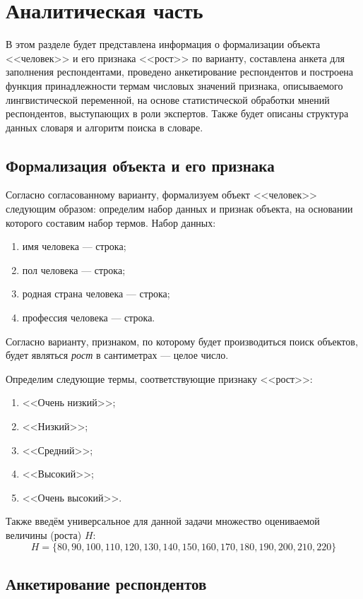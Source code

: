 \chapter{Аналитическая часть}
В этом разделе будет представлена информация о формализации объекта <<человек>> и его признака <<рост>> по варианту, составлена анкета для заполнения респондентами, проведено анкетирование респондентов и построена функция принадлежности термам числовых значений признака, описываемого лингвистической переменной, на основе статистической обработки мнений респондентов, выступающих в роли экспертов.
Также будет описаны структура данных словаря и алгоритм поиска в словаре. 

\section{Формализация объекта и его признака}
Согласно согласованному варианту, формализуем объект <<человек>> следующим образом: определим набор данных и признак объекта, на основании которого составим набор термов.
Набор данных:
\begin{enumerate}[label=\arabic*)]
	\item имя человека --- строка;
	\item пол человека --- строка;
	\item родная страна человека --- строка;
	\item профессия человека --- строка.
\end{enumerate}
Согласно варианту, признаком, по которому будет производиться поиск объектов, будет являться \textit{рост} в сантиметрах --- целое число.

Определим следующие термы, соответствующие признаку <<рост>>:
\begin{enumerate}[label=\arabic*)]
	\item <<Очень низкий>>;
	\item <<Низкий>>;
	\item <<Средний>>;
	\item <<Высокий>>;
	\item <<Очень высокий>>.
\end{enumerate}

Также введём универсальное для данной задачи множество оцениваемой величины (роста) $H$:
\begin{equation}
	\label{eq:h}
	H = \{80, 90, 100, 110, 120, 130, 140, 150, 160, 170, 180, 190, 200, 210, 220\}
\end{equation}

\section{Анкетирование респондентов}

